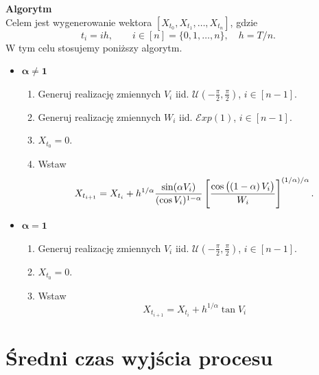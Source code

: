 \documentclass[12pt]{mwrep}
\begin{document}
	\noindent\textbf{Algorytm}\\
	Celem jest wygenerowanie wektora $\left[ X_{t_0},X_{t_1},\dots,X_{t_n} \right]$, gdzie
	\begin{equation}
		t_i=ih, \quad\quad i\in[n]=\{0,1,\dots,n\},\quad h=T/n.
	\end{equation}
	W tym celu stosujemy poniższy algorytm.\\
	\begin{itemize}
		\item $\boldsymbol{\alpha\neq 1}$

		\begin{enumerate}
			\item Generuj realizację zmiennych $V_i$ iid. $\mathcal{U}\left(-\frac{\pi}{2},\frac{\pi}{2}\right)$, $i\in[n-1]$.
			\item Generuj realizację zmiennych $W_i$ iid. $\mathcal{E}xp(1)$, $i\in[n-1]$.
			\item $X_{t_0}=0$.
			\item Wstaw
			\begin{equation}
				X_{t_{i+1}}=X_{t_i} + h^{1/\alpha}\frac{\sin(\alpha V_i)}{(\cos V_i)^{1-\alpha}} \left[\frac{\cos\left(\left(1-\alpha\right) V_i\vphantom{\frac{1}{1}}\right)}{W_i}\right]^{(1/\alpha)/\alpha}.
			\end{equation}
		\end{enumerate}
		\item $\boldsymbol{\alpha= 1}$
		\begin{enumerate}
			\item Generuj realizację zmiennych $V_i$ iid. $\mathcal{U}\left(-\frac{\pi}{2},\frac{\pi}{2}\right)$, $i\in[n-1]$.
			\item $X_{t_0}=0$.
			\item Wstaw
			\begin{equation}
				X_{t_{i+1}}=X_{t_i} + h^{1/\alpha}\tan V_i
			\end{equation}
	\end{enumerate}
	\end{itemize}

	\section{Średni czas wyjścia procesu}
		
\end{document}
